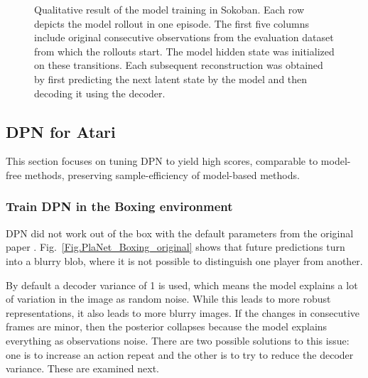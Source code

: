 \begin{figure}[H]
\caption[Qualitative result of the PlaNet model training in Sokoban]{Qualitative result of the model training in Sokoban. Each row depicts the model rollout in one episode. The first five columns include original consecutive observations from the evaluation dataset from which the rollouts start. The model hidden state was initialized on these transitions. Each subsequent reconstruction was obtained by first predicting the next latent state by the model and then decoding it using the decoder.}
\label{Fig.PlaNet_Sokoban_openloop}
\end{figure}

\subsection{DPN for Atari}

This section focuses on tuning DPN to yield high scores, comparable to model-free methods, preserving sample-efficiency of model-based methods.

\subsubsection{Train DPN in the Boxing environment}

DPN did not work out of the box with the default parameters from the original paper \cite{Algo.PlaNet}. Fig.~\ref{Fig.PlaNet_Boxing_original} shows that future predictions turn into a blurry blob, where it is not possible to distinguish one player from another.

By default a decoder variance of 1 is used, which means the model explains a lot of variation in the image as random noise. While this leads to more robust representations, it also leads to more blurry images. If the changes in consecutive frames are minor, then the posterior collapses because the model explains everything as observations noise. There are two possible solutions to this issue: one is to increase an action repeat and the other is to try to reduce the decoder variance. These are examined next.

